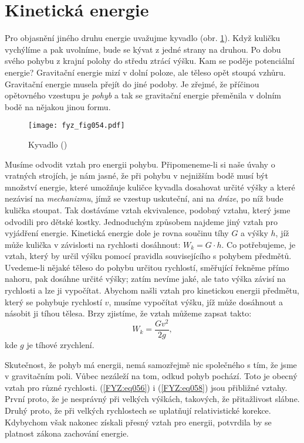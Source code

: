   \section{Kinetická energie}
    Pro objasnění jiného druhu energie uvažujme kyvadlo (obr. \ref{fyz:fig054}). Když kuličku 
    vychýlíme a pak uvolníme, bude se kývat z jedné strany na druhou. Po dobu svého pohybu z krajní 
    polohy do středu ztrácí výšku. Kam se poděje potenciální energie? Gravitační energie mizí v 
    dolní poloze, ale těleso opět stoupá vzhůru. Gravitační energie musela přejít do jiné podoby. 
    Je zřejmé, že příčinou opětovného vzestupu je \emph{pohyb} a tak se gravitační energie 
    přeměnila v dolním bodě na nějakou jinou formu.
    
    \begin{figure}[ht!]  %
      \centering
      \texttt{[image: fyz\_fig054.pdf]}
      \caption{Kyvadlo (\cite[s.~56]{Feynman01})}
      \label{fyz:fig054}
    \end{figure}
    Musíme odvodit vztah pro energii pohybu. Připomeneme-li si naše úvahy o vratných strojích, je 
    nám jasné, že při pohybu v nejnižším bodě musí být množství energie, které umožňuje kuličce 
    kyvadla dosahovat určité výšky a které nezávisí na \emph{mechanizmu}, jímž se vzestup 
    uskuteční, ani na \emph{dráze}, po níž bude kulička stoupat. Tak dostáváme vztah ekvivalence, 
    podobný vztahu, který jsme odvodili pro dětské kostky. Jednoduchým způsobem najdeme jiný vztah 
    pro vyjádření energie. Kinetická energie dole je rovna součinu tíhy \(G\) a výšky \(h\), jíž 
    může kulička v závislosti na rychlosti dosáhnout: \(W_k=G\cdot h\). Co potřebujeme, je vztah, 
    který by určil výšku pomocí pravidla souvisejícího s pohybem předmětů. Uvedeme-li nějaké těleso 
    do pohybu určitou rychlostí, směřující řekněme přímo nahoru, pak dosáhne určité výšky; zatím 
    nevíme jaké, ale tato výška závisí na rychlosti a lze ji vypočítat. Abychom našli vztah pro 
    kinetickou energii předmětu, který se pohybuje rychlostí \(v\), musíme vypočítat výšku, jíž 
    může dosáhnout a násobit ji tíhou tělesa. Brzy zjistíme, že vztah můžeme zapsat takto:
    \begin{equation}\label{FYZ:eq058}
      W_k = \frac{Gv^2}{2g},
    \end{equation}
    kde \(g\) je tíhové zrychlení.
    
    Skutečnost, že pohyb má energii, nemá samozřejmě nic společného s tím, že jsme v gravitačním 
    poli. Vůbec nezáleží na tom, odkud pohyb pochází. Toto je obecný vztah pro různé rychlosti. 
    (\ref{FYZ:eq056}) i (\ref{FYZ:eq058}) jsou přibližné vztahy. První proto, že je nesprávný při 
    velkých výškách, takových, že přitažlivost slábne. Druhý proto, že při velkých rychlostech se 
    uplatňují relativistické korekce. Kdybychom však nakonec získali přesný vztah pro energii, 
    potvrdila by se platnost zákona zachování energie.

